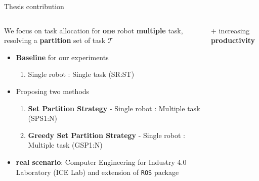     \begin{frame}[fragile]{Thesis contribution}
        \begin{columns}
            \begin{column}{.7\textwidth}
            We focus on task allocation for {\bf one} robot {\bf multiple} task,            
            resolving a {\bf partition} set of task $\mathcal{T}$
            
            \begin{itemize}
                
                \item {\bf Baseline} for our experiments

                \begin{enumerate}
                    \item Single robot : Single task (SR:ST)
                \end{enumerate}

                \item Proposing two methods
                \begin{enumerate}
                    \item {\bf Set Partition Strategy} - Single robot : Multiple task (SPS1:N)
                    \item {\bf Greedy Set Partition Strategy} - Single robot : Multiple task (GSP1:N)
                \end{enumerate}
                \item {\bf real scenario}: Computer Engineering for Industry 4.0 Laboratory (ICE Lab) and  extension of  \texttt{ROS}  package
            \end{itemize}
            \end{column}
            \begin{column}{.4\textwidth}
                $+$ increasing {\bf productivity}
                

\end{column}
\end{columns}
\end{frame}
